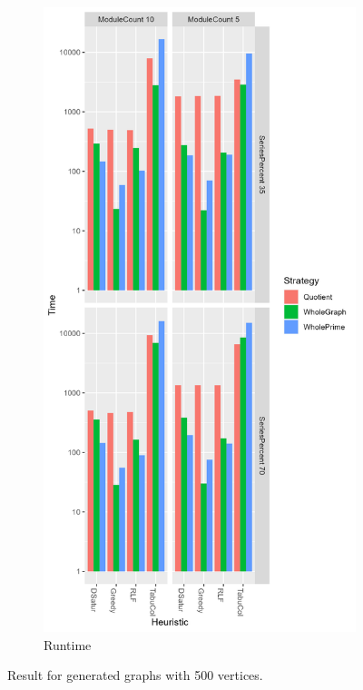 \documentclass[a4paper]{article}
\begin{document}
\begin{figure}[p]
\begin{subfigure}{\resultbase}
    \end{subfigure}%
    \begin{subfigure}{\resultbase}
        \includegraphics[width=\columnwidth]{Tables/500Time.png}
      \caption{Runtime}
      \label{fig:500t}
    \end{subfigure}
\caption{Result for generated graphs with 500 vertices. \facfigdesc}
\label{fig:500}
\end{figure}
\end{document}
